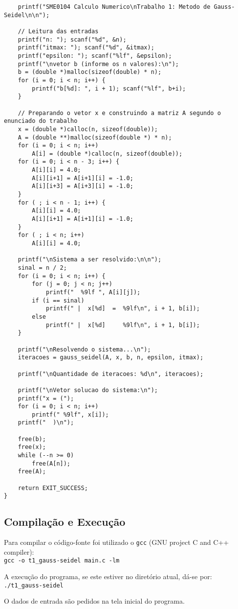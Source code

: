 \begin{lstlisting}
	printf("SME0104 Calculo Numerico\nTrabalho 1: Metodo de Gauss-Seidel\n\n");

	// Leitura das entradas
	printf("n: "); scanf("%d", &n);
	printf("itmax: "); scanf("%d", &itmax);
	printf("epsilon: "); scanf("%lf", &epsilon);
	printf("\nvetor b (informe os n valores):\n");
	b = (double *)malloc(sizeof(double) * n);
	for (i = 0; i < n; i++) {
		printf("b[%d]: ", i + 1); scanf("%lf", b+i);
	}

	// Preparando o vetor x e construindo a matriz A segundo o enunciado do trabalho
	x = (double *)calloc(n, sizeof(double));
	A = (double **)malloc(sizeof(double *) * n);
	for (i = 0; i < n; i++)
		A[i] = (double *)calloc(n, sizeof(double));
	for (i = 0; i < n - 3; i++) {
		A[i][i] = 4.0;
		A[i][i+1] = A[i+1][i] = -1.0;
		A[i][i+3] = A[i+3][i] = -1.0;
	}
	for ( ; i < n - 1; i++) {
		A[i][i] = 4.0;
		A[i][i+1] = A[i+1][i] = -1.0;
	}
	for ( ; i < n; i++)
		A[i][i] = 4.0;

	printf("\nSistema a ser resolvido:\n\n");
	sinal = n / 2;
	for (i = 0; i < n; i++) {
		for (j = 0; j < n; j++)
			printf("  %9lf ", A[i][j]);
		if (i == sinal)
			printf(" |  x[%d]  =  %9lf\n", i + 1, b[i]);
		else
			printf(" |  x[%d]     %9lf\n", i + 1, b[i]);
	}

	printf("\nResolvendo o sistema...\n");
	iteracoes = gauss_seidel(A, x, b, n, epsilon, itmax);

	printf("\nQuantidade de iteracoes: %d\n", iteracoes);

	printf("\nVetor solucao do sistema:\n");
	printf("x = (");
	for (i = 0; i < n; i++)
		printf(" %9lf", x[i]);
	printf("  )\n");

	free(b);
	free(x);
	while (--n >= 0)
		free(A[n]);
	free(A);

	return EXIT_SUCCESS;
}
\end{lstlisting}

\subsection{Compilação e Execução}

Para compilar o código-fonte foi utilizado o \texttt{gcc} (GNU project C and C++ compiler):\\
\indent\verb|gcc -o t1_gauss-seidel main.c -lm|

A execução do programa, se este estiver no diretório atual, dá-se por:\\
\indent\verb|./t1_gauss-seidel|

O dados de entrada são pedidos na tela inicial do programa.

